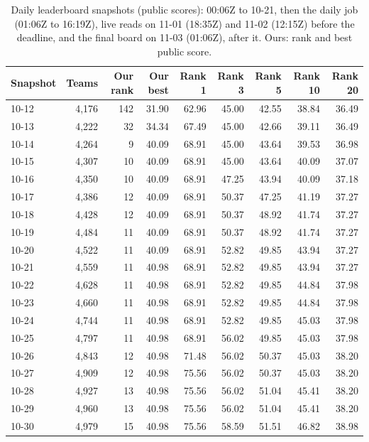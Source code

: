 \begin{table}[!htb]
\caption{Daily leaderboard snapshots (public scores): 00:06Z to 10-21, then the daily job (01:06Z to 16:19Z), live reads on 11-01 (18:35Z) and 11-02 (12:15Z) before the deadline, and the final board on 11-03 (01:06Z), after it. Ours: rank and best public score.}\label{tab:rank} %
\centering\footnotesize
\begin{tabular}{@{}lrrrrrrrr@{}}
\toprule
Snapshot & Teams & Our rank & Our best & Rank 1 & Rank 3 & Rank 5 & Rank 10 & Rank 20 \\
\midrule
10-12 & 4,176 & 142 & 31.90 & 62.96 & 45.00 & 42.55 & 38.84 & 36.49 \\
10-13 & 4,222 & 32 & 34.34 & 67.49 & 45.00 & 42.66 & 39.11 & 36.49 \\
10-14 & 4,264 & 9 & 40.09 & 68.91 & 45.00 & 43.64 & 39.53 & 36.98 \\
10-15 & 4,307 & 10 & 40.09 & 68.91 & 45.00 & 43.64 & 40.09 & 37.07 \\
10-16 & 4,350 & 10 & 40.09 & 68.91 & 47.25 & 43.94 & 40.09 & 37.18 \\
10-17 & 4,386 & 12 & 40.09 & 68.91 & 50.37 & 47.25 & 41.19 & 37.27 \\
10-18 & 4,428 & 12 & 40.09 & 68.91 & 50.37 & 48.92 & 41.74 & 37.27 \\
10-19 & 4,484 & 11 & 40.09 & 68.91 & 50.37 & 48.92 & 41.74 & 37.27 \\
10-20 & 4,522 & 11 & 40.09 & 68.91 & 52.82 & 49.85 & 43.94 & 37.27 \\
10-21 & 4,559 & 11 & 40.98 & 68.91 & 52.82 & 49.85 & 43.94 & 37.27 \\
10-22 & 4,628 & 11 & 40.98 & 68.91 & 52.82 & 49.85 & 44.84 & 37.98 \\
10-23 & 4,660 & 11 & 40.98 & 68.91 & 52.82 & 49.85 & 44.84 & 37.98 \\
10-24 & 4,744 & 11 & 40.98 & 68.91 & 52.82 & 49.85 & 45.03 & 37.98 \\
10-25 & 4,797 & 11 & 40.98 & 68.91 & 56.02 & 49.85 & 45.03 & 37.98 \\
10-26 & 4,843 & 12 & 40.98 & 71.48 & 56.02 & 50.37 & 45.03 & 38.20 \\
10-27 & 4,909 & 12 & 40.98 & 75.56 & 56.02 & 50.37 & 45.03 & 38.20 \\
10-28 & 4,927 & 13 & 40.98 & 75.56 & 56.02 & 51.04 & 45.41 & 38.20 \\
10-29 & 4,960 & 13 & 40.98 & 75.56 & 56.02 & 51.04 & 45.41 & 38.20 \\
10-30 & 4,979 & 15 & 40.98 & 75.56 & 58.59 & 51.51 & 46.82 & 38.98 \\

\end{tabular}
\end{table}
